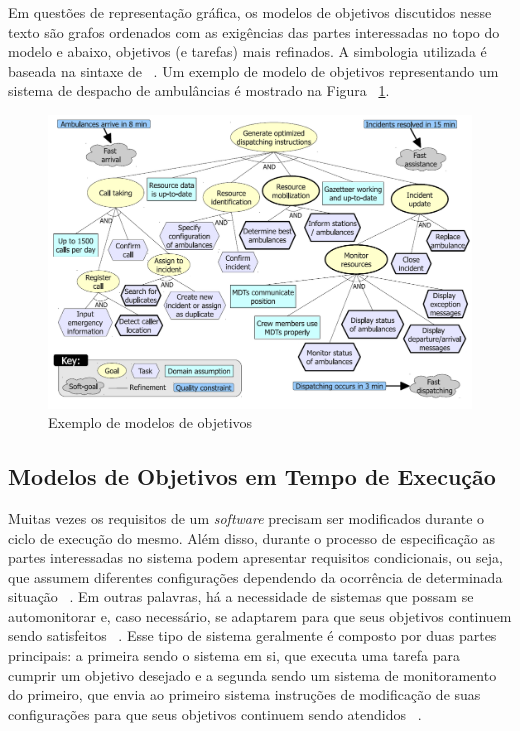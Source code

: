 Em questões de representação gráfica, os modelos de objetivos discutidos nesse texto são grafos ordenados com as exigências das partes interessadas no topo do modelo e abaixo, objetivos (e tarefas) mais refinados. A simbologia utilizada é baseada na sintaxe de \istar ~\cite{yu20111}. Um exemplo de modelo de objetivos representando um sistema de despacho de ambulâncias é mostrado na Figura ~\ref{figura-acad-simples}.

\begin{figure}[h]
	\centering
	\includegraphics[width=1\textwidth]{figuras/modelos/ACAD-Simples.png}
	\caption{Exemplo de modelos de objetivos ~\cite{tesevitor}}
	\label{figura-acad-simples}
\end{figure}


\subsection{Modelos de Objetivos em Tempo de Execução}
\label{sec-referencial-engenharia-objetivos-runtime}

Muitas vezes os requisitos de um \textit{software} precisam ser modificados durante o ciclo de execução do mesmo. Além disso, durante o processo de especificação as partes interessadas no sistema podem apresentar requisitos condicionais, ou seja, que assumem diferentes configurações dependendo da ocorrência de determinada situação ~\cite{souza2012requirement}. Em outras palavras, há a necessidade de sistemas que possam se automonitorar e, caso necessário, se adaptarem para que seus objetivos continuem sendo satisfeitos ~\cite{dalpiaz2013runtime}. Esse tipo de sistema geralmente é composto por duas partes principais: a primeira sendo o sistema em si, que executa uma tarefa para cumprir um objetivo desejado e a segunda sendo um sistema de monitoramento do primeiro, que envia ao primeiro sistema instruções de modificação de suas configurações para que seus objetivos continuem sendo atendidos ~\cite{souza2013awareness}. 

